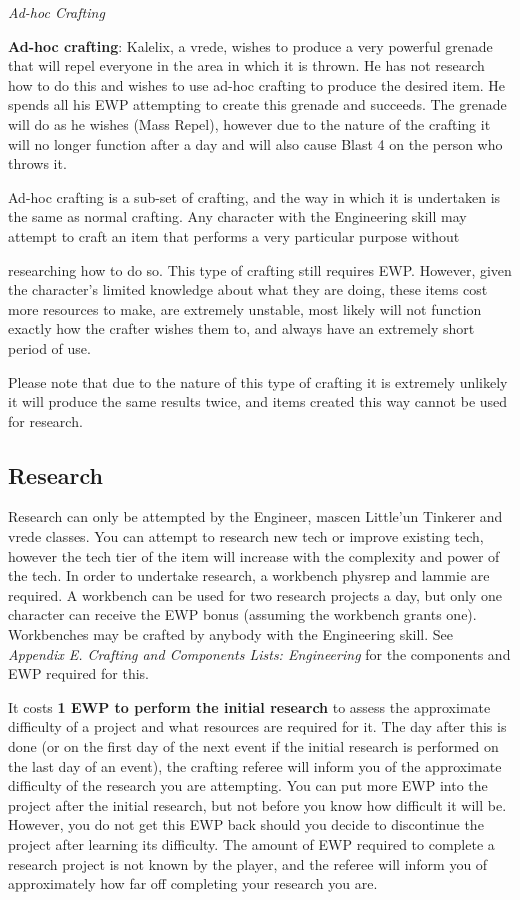 \documentclass{scrbook}
\begin{document}
\textit{Ad-hoc Crafting}

\textbf{Ad-hoc crafting}: Kalelix, a vrede, wishes to produce a very powerful grenade that will repel everyone in the area in which it is thrown. He has not research how to do this and wishes to use ad-hoc crafting to produce the desired item. He spends all his EWP attempting to create this grenade and succeeds. The grenade will do as he wishes (Mass Repel), however due to the nature of the crafting it will no longer function after a day and will also cause Blast 4 on the person who throws it.

Ad-hoc crafting is a sub-set of crafting, and the way in which it is undertaken is the same as normal crafting. Any character with the Engineering skill may attempt to craft an item that performs a very particular purpose without

researching how to do so. This type of crafting still requires EWP. However, given the character's limited knowledge about what they are doing, these items cost more resources to make, are extremely unstable, most likely will not function exactly how the crafter wishes them to, and always have an extremely short period of use.

Please note that due to the nature of this type of crafting it is extremely unlikely it will produce the same results twice, and items created this way cannot be used for research.

\subsection{Research}

Research can only be attempted by the Engineer, mascen Little'un Tinkerer and vrede classes. You can attempt to research new tech or improve existing tech, however the tech tier of the item will increase with the complexity and power of the tech. In order to undertake research, a workbench physrep and lammie are required. A workbench can be used for two research projects a day, but only one character can receive the EWP bonus (assuming the workbench grants one). Workbenches may be crafted by anybody with the Engineering skill. See \textit{Appendix E. Crafting and Components Lists: Engineering} for the components and EWP required for this.

It costs \textbf{1 EWP to perform the initial research} to assess the approximate difficulty of a project and what resources are required for it. The day after this is done (or on the first day of the next event if the initial research is performed on the last day of an event), the crafting referee will inform you of the approximate difficulty of the research you are attempting. You can put more EWP into the project after the initial research, but not before you know how difficult it will be. However, you do not get this EWP back should you decide to discontinue the project after learning its difficulty. The amount of EWP required to complete a research project is not known by the player, and the referee will inform you of approximately how far off completing your research you are.
\end{document}
